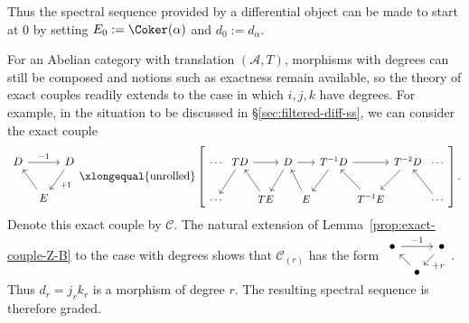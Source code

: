 Thus the spectral sequence provided by a differential object can be made to
start at $0$ by setting $E_0:=\Coker(\alpha)$ and $d_0:=d_\alpha$.

For an Abelian category with translation $(\mathcal{A},T)$, morphisms with
degrees can still be composed and notions such as exactness remain available,
so the theory of exact couples readily extends to the case in which $i,j,k$
have degrees. For example, in the situation to be discussed in
\S\ref{sec:filtered-diff-ss}, we can consider the exact couple
\[\begin{tikzcd}[column sep=tiny]
	D \arrow[rr, "{-1}"] & & D \arrow[ld, "{+1}"] \\
	& E \arrow[lu] &
\end{tikzcd} \xlongequal{\text{unrolled}} \left[
	\begin{tikzcd}[column sep=0ex, every cell/.append style={font=\small}]
		\cdots & TD \arrow[rr] \arrow[ld] & & D \arrow[rr] \arrow[ld] & &
		T^{-1}D \arrow[rr] \arrow[ld] & & T^{-2}D \arrow[ld] & \cdots \\
		\cdots & & TE \arrow[lu] & & E \arrow[lu] & &
		T^{-1}E \arrow[lu] & & \cdots \arrow[lu]
	\end{tikzcd}
\right]. \]
Denote this exact couple by $\mathscr{C}$. The natural extension of
Lemma~\ref{prop:exact-couple-Z-B} to the case with degrees shows that
$\mathscr{C}_{(r)}$ has the form
$\begin{tikzcd}[column sep=tiny, row sep=small]
	\bullet \arrow[rr, "{-1}"] & & \bullet \arrow[ld, "{+r}"] \\
	& \bullet \arrow[lu] &
\end{tikzcd}$.
Thus $d_r=j_rk_r$ is a morphism of degree $r$. The resulting spectral sequence
is therefore graded.
